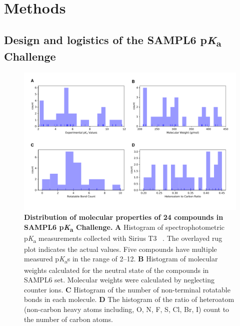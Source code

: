 \documentclass[9pt,lineno,final]{elife}
\newcommand{\pKa}{p\textit{K}\textsubscript{a}}
\begin{document}
\section{Methods}

\subsection{Design and logistics of the SAMPL6 \pKa{} Challenge}

\begin{figure}
\begin{center}
\includegraphics[width=1.0\linewidth]{figures/distribution_of_molecular_properties.pdf}
\caption{{\bf Distribution of molecular properties of 24 compounds in SAMPL6 \pKa{} Challenge.} {\bf A} Histogram of spectrophotometric \pKa{} measurements collected with Sirius T3 ~\cite{Isik:2018:J.Comput.AidedMol.Des.}. 
The overlayed rug plot indicates the actual values. 
Five compounds have multiple measured \pKa{}s in the range of 2--12. 
{\bf B} Histogram of molecular weights calculated for the neutral state of the compounds in SAMPL6 set. 
Molecular weights were calculated by neglecting counter ions.  
{\bf C} Histogram of the number of non-terminal rotatable bonds in each molecule. 
{\bf D} The histogram of the ratio of heteroatom (non-carbon heavy atoms including, O, N, F, S, Cl, Br, I) count to the number of carbon atoms.
}
\label{fig:dist_mol_prop}
\end{center}
\end{figure}
\end{document}
